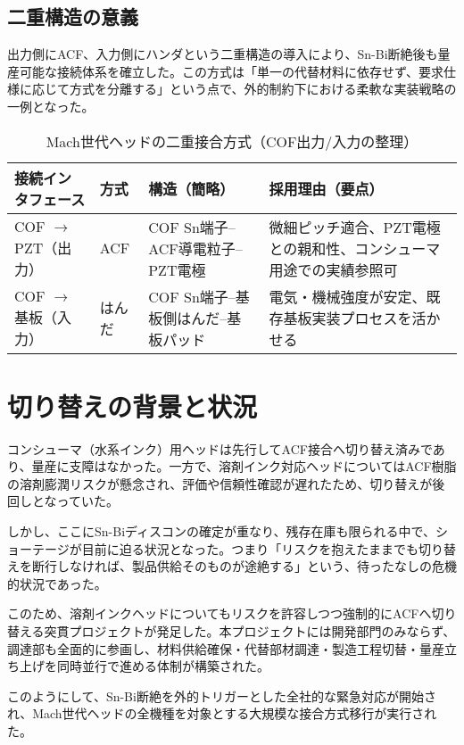 \documentclass[conference]{IEEEtran}
\begin{document}
\subsection{二重構造の意義}
出力側にACF、入力側にハンダという二重構造の導入により、Sn-Bi断絶後も量産可能な接続体系を確立した。この方式は「単一の代替材料に依存せず、要求仕様に応じて方式を分離する」という点で、外的制約下における柔軟な実装戦略の一例となった。

\begin{table}[t]
\centering
\footnotesize
\caption{Mach世代ヘッドの二重接合方式（COF出力/入力の整理）}
\label{tab:dual-bond}
\renewcommand{\arraystretch}{1.1}
\begin{tabularx}{\columnwidth}{@{}p{1.95cm} p{1.25cm} Y Y@{}}
\toprule
接続インタフェース & 方式 & 構造（簡略） & 採用理由（要点） \\
\midrule
COF $\rightarrow$ PZT（出力） & ACF &
COF Sn端子–ACF導電粒子–PZT電極 &
微細ピッチ適合、PZT電極との親和性、コンシューマ用途での実績参照可 \\
\addlinespace[2pt]
COF $\rightarrow$ 基板（入力） & はんだ &
COF Sn端子–基板側はんだ–基板パッド &
電気・機械強度が安定、既存基板実装プロセスを活かせる \\
\bottomrule
\end{tabularx}
\end{table}

\section{切り替えの背景と状況}
コンシューマ（水系インク）用ヘッドは先行してACF接合へ切り替え済みであり、量産に支障はなかった。一方で、溶剤インク対応ヘッドについてはACF樹脂の溶剤膨潤リスクが懸念され、評価や信頼性確認が遅れたため、切り替えが後回しとなっていた。  

しかし、ここにSn-Biディスコンの確定が重なり、残存在庫も限られる中で、ショーテージが目前に迫る状況となった。つまり「リスクを抱えたままでも切り替えを断行しなければ、製品供給そのものが途絶する」という、待ったなしの危機的状況であった。  

このため、溶剤インクヘッドについてもリスクを許容しつつ強制的にACFへ切り替える突貫プロジェクトが発足した。本プロジェクトには開発部門のみならず、調達部も全面的に参画し、材料供給確保・代替部材調達・製造工程切替・量産立ち上げを同時並行で進める体制が構築された。  

このようにして、Sn-Bi断絶を外的トリガーとした全社的な緊急対応が開始され、Mach世代ヘッドの全機種を対象とする大規模な接合方式移行が実行された。
\end{document}
